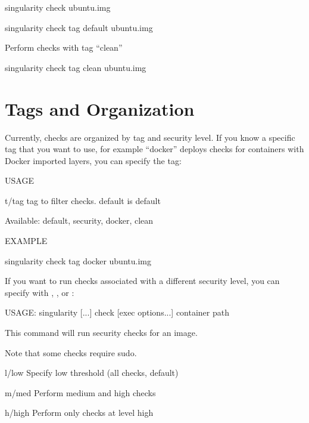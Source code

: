 \documentclass[letterpaper,10pt,english]{sphinxmanual}
\begin{document}
%
\begin{sphinxVerbatim}[commandchars=\\\{\}]
\PYGZdl{} singularity check ubuntu.img

\PYGZdl{} singularity check \PYGZhy{}\PYGZhy{}tag default ubuntu.img
\end{sphinxVerbatim}

Perform checks with tag “clean”

%
\begin{sphinxVerbatim}[commandchars=\\\{\}]
\PYGZdl{} singularity check \PYGZhy{}\PYGZhy{}tag clean ubuntu.img
\end{sphinxVerbatim}


\section{Tags and Organization}
\label{\detokenize{container_checks:tags-and-organization}}
Currently, checks are organized by tag and security level. If you know a
specific tag that you want to use, for example “docker” deploys checks
for containers with Docker imported layers, you can specify the tag:

%
\begin{sphinxVerbatim}[commandchars=\\\{\}]
USAGE

    \PYGZhy{}t/\PYGZhy{}\PYGZhy{}tag       tag to filter checks. default is \PYGZdq{}default\PYGZdq{}

                      Available: default, security, docker, clean


EXAMPLE

\PYGZdl{} singularity check \PYGZhy{}\PYGZhy{}tag docker ubuntu.img
\end{sphinxVerbatim}

If you want to run checks associated with a different security level,
you can specify with  ,  , or  :

%
\begin{sphinxVerbatim}[commandchars=\\\{\}]
USAGE: singularity [...] check [exec options...] \PYGZlt{}container path\PYGZgt{}

This command will run security checks for an image.

Note that some checks require sudo.


    \PYGZhy{}l/\PYGZhy{}\PYGZhy{}low       Specify low threshold (all checks, default)

    \PYGZhy{}m/\PYGZhy{}\PYGZhy{}med       Perform medium and high checks

    \PYGZhy{}h/\PYGZhy{}\PYGZhy{}high      Perform only checks at level high
\end{sphinxVerbatim}
\end{document}
